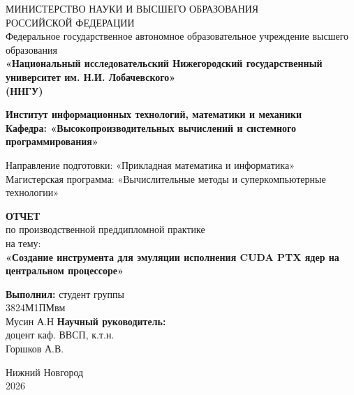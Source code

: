 \begin{titlepage}

    \begin{center}
        {МИНИСТЕРСТВО НАУКИ И ВЫСШЕГО ОБРАЗОВАНИЯ \\
        РОССИЙСКОЙ ФЕДЕРАЦИИ}
        \\
        Федеральное государственное автономное образовательное учреждение высшего образования
        \\
        {\bfseries «Национальный исследовательский Нижегородский государственный университет им. Н.И. Лобачевского»\\(ННГУ)}
    
        \vspace{1em}
  
        {\bfseries Институт информационных технологий, математики и механики \\
        Кафедра: «Высокопроизводительных вычислений и системного программирования»} \\
        
        \vspace{1em}

        Направление подготовки: «Прикладная математика и информатика» \\
        Магистерская программа: «Вычислительные методы и суперкомпьютерные технологии»
    
    \end{center}


    \begin{center}
    \end{center}

    \vspace{5em}

    \begin{center}
        \textbf{ОТЧЕТ} \\
        по производственной преддипломной практике \\
        на тему: \\
        \textbf{«Создание инструмента для эмуляции исполнения CUDA PTX ядер на центральном процессоре»}
    \end{center}

    \vspace{6em}


    \begin{flushright}
        {\bfseries Выполнил:} студент группы\\3824М1ПМвм\\Мусин А.Н \underline{\hspace{3cm}} \linebreak\linebreak\linebreak
        {\bfseries Научный руководитель:}\\ доцент каф. ВВСП, к.т.н.\\ Горшков А.В.\underline{\hspace{3cm}} 
    \end{flushright}


    \vspace{\fill}

    \begin{center}
        Нижний Новгород\\2026
    \end{center}

\end{titlepage}
